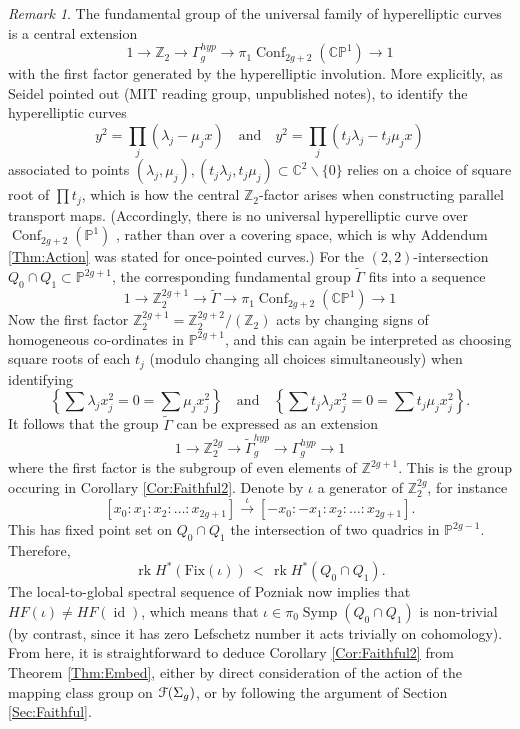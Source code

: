 \documentclass[reqno,10pt]{amsart}
\numberwithin{equation}{section}
\newcommand{\bC}{{\mathbb C}}
\newcommand{\bP}{{\mathbb P}}
\newcommand{\bZ}{{\mathbb Z}}
\newcommand{\Z}{\mathbb{Z}}
\newcommand{\scrF}{\EuScript{F}}
\newcommand{\id}{\operatorname{id}}
\newcommand{\rk}{\operatorname{rk}}
\newcommand{\Symp}{\operatorname{Symp}}
\newcommand{\Conf}{\operatorname{Conf}}
\theoremstyle{remark}
\newtheorem{Remark}[thm]{Remark}
\begin{document}
\begin{Remark}\label{Rem:BranchingInfinity} 
The fundamental group of the universal family of hyperelliptic curves is a central extension 
\[
1 \rightarrow \bZ_2 \longrightarrow \Gamma_g^{hyp} \longrightarrow \pi_1\Conf_{2g+2}(\bC\bP^1) \rightarrow 1
\]
with the first factor generated by the hyperelliptic involution. More explicitly, as Seidel pointed out (MIT reading group, unpublished notes), to identify the hyperelliptic curves
\[
y^2 = \prod_j (\lambda_j - \mu_j x)  \quad \textrm{and} \quad  y^2 = \prod_j (t_j \lambda_j - t_j\mu_j x) 
\]
associated to points $(\lambda_j, \mu_j),  (t_j\lambda_j, t_j\mu_j) \subset \bC^2\backslash \{0\}$ relies on a choice of square root of $\prod t_j$, which is how the central $\bZ_2$-factor arises when constructing parallel transport maps. (Accordingly, there is no universal hyperelliptic curve  over $\Conf_{2g+2}(\bP^1)$ \cite{Mess},  rather than over a covering space, which is why Addendum \ref{Thm:Action} was stated for once-pointed curves.)  For the $(2,2)$-intersection $Q_0 \cap Q_1 \subset \bP^{2g+1}$, the corresponding fundamental group $\widetilde{\Gamma}$ fits into a sequence
\[
1 \rightarrow \bZ_2^{2g+1} \longrightarrow \widetilde{\Gamma} \longrightarrow \pi_1 \Conf_{2g+2}(\bC\bP^1) \rightarrow 1
\]
Now the first factor $\bZ_2^{2g+1} = \bZ_2^{2g+2} / (\Z_2)$ acts by changing signs of homogeneous co-ordinates in $\bP^{2g+1}$, and this can again be interpreted as choosing square roots of each $t_j$ (modulo changing all choices simultaneously) when identifying 
\[
\left\{ \sum \lambda_j x_j^2 = 0 = \sum \mu_j x_j^2 \right\}  \quad \textrm{and} \quad \left\{ \sum t_j \lambda_j x_j^2 = 0 = \sum t_j \mu_j x_j^2 \right\}.
\]
It follows that the group $\widetilde{\Gamma}$ can be expressed as an extension
\[
1 \rightarrow \bZ_2^{2g} \longrightarrow \tilde{\Gamma}_g^{hyp} \longrightarrow \Gamma_g^{hyp} \rightarrow 1
\]
where the first factor is the subgroup of even elements of $\bZ^{2g+1}$. 
This is the group occuring in Corollary \ref{Cor:Faithful2}. Denote by $\iota$ a generator of $\bZ_2^{2g}$, for instance
 \[
 [x_0: x_1: x_2 : \ldots : x_{2g+1}] \stackrel{\iota}{\longrightarrow}  [-x_0: -x_1: x_2 : \ldots : x_{2g+1}].
 \]
This has fixed point set on $Q_0 \cap Q_1$ the intersection of two quadrics in $\bP^{2g-1}$. Therefore, 
   \[
   \rk H^*(\textrm{Fix}(\iota)) \, < \, \rk H^*(Q_0 \cap Q_1).
   \]    
   The local-to-global spectral sequence of Pozniak \cite{Pozniak} now implies that $HF(\iota) \neq HF(\id)$, which means that $\iota \in \pi_0\Symp(Q_0 \cap Q_1)$ is non-trivial (by contrast, since it has zero Lefschetz number it acts trivially on cohomology).  From here, it is straightforward to deduce Corollary \ref{Cor:Faithful2} from Theorem \ref{Thm:Embed}, either by direct consideration of the action of the mapping class group on $\scrF(\Sigma_g)$,  or by following the argument of Section \ref{Sec:Faithful}.
\end{Remark}
\end{document}

